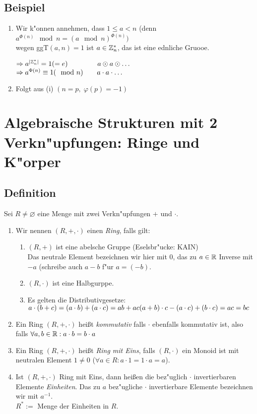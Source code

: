  
 \subsection{Beispiel}
 \begin{enumerate}
 \item
 Wir k"onnen annehmen, dass $1 \leq a < n $ (denn $a^{\Phi(n)} \mod{n}= (a \mod{n})^{\Phi(n)})$\\
 wegen ggT$(a,n)=1$ ist $a \in \mathbb{Z}^*_n$, das ist eine ednliche Gruooe.
 
 $\Rightarrow a^{|\mathbb{Z}^*_n|}=1(=e) \hspace{1.5cm} a \odot a \odot \dots$\\
 $\Rightarrow a^{\Phi(n)} \equiv 1 (\mod{n}) \hspace{0.7cm} a \cdot a \cdot \dots $ 
 \item
 Folgt aus (i) $(n=p,\; \varphi (p) = -1)$

\end{enumerate}
\section{Algebraische Strukturen mit 2 Verkn"upfungen: Ringe und K"orper}

\subsection[Definition: Ring]{Definition}
Sei $R \neq \varnothing$ eine Menge mit zwei Verkn"upfungen $+$ und $\cdot$.
\begin{enumerate}
	\item
	Wir nennen $(R, +, \cdot)$ einen \emph{Ring}, falls gilt:\\
	\begin{enumerate}
		\item
		$(R,+)$ ist eine abelsche Gruppe (Eselsbr"ucke: KAIN)\\
		Das neutrale Element bezeichnen wir hier mit $0$, das zu $a \in \mathbb{R}$ Inverse mit $-a$ (schreibe auch $a-b$ f"ur $a=(-b)$.
		\item
		$(R,\cdot)$ ist eine Halbgurppe.
		\item
		Es gelten die Distributivgesetze:\\
		$a\cdot (b+c) = (a \cdot b) + (a \cdot c) = ab + ac\\
		(a+b) \cdot c - (a \cdot c) + (b \cdot c) = ac = bc$
	\end{enumerate}
	\item
	Ein Ring $(R,+, \cdot)$ heißt \emph{kommutativ} falls $\cdot$ ebenfalls kommutativ ist, also falls $\forall a,b \in \mathbb{R}: a \cdot b = b \cdot a$
	\item
	Ein Ring $(R,+, \cdot)$ heißt \emph{Ring mit Eins}, falls $(R, \cdot)$ ein Monoid ist mit neutralen Element $1\neq 0$ ($\forall a \in R: a \cdot 1 = 1 \cdot a = a$).
	\item
	Ist $(R, +, \cdot)$ Ring mit Eins, dann heißen die bez"uglich $\cdot$ invertierbaren Elemente \emph{Einheiten}. Das zu $a$ bez"ugliche $\cdot$
	invertierbare Elemente bezeichnen wir mit $a^{-1}$.\\ $R^* :=$ Menge der Einheiten in $R$.
\end{enumerate}
